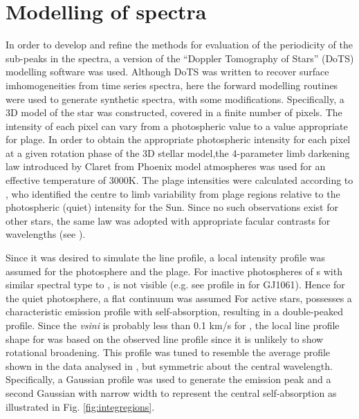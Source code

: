 \chapter{Modelling of {\prox} spectra}
\protect\label{chapter:modelling}

In order to develop and refine the methods for evaluation of the periodicity of the sub-peaks in the {\prox} spectra, a
version of the ``Doppler Tomography of Stars'' (DoTS) modelling software \citep{CCamerondotsa} was used. Although DoTS
was written to recover surface imhomogeneities from time series spectra, here the forward modelling routines were used
to generate synthetic spectra, with some modifications. Specifically, a 3D model of the star was constructed, covered in
a finite number of pixels. The intensity of each pixel can vary from a photospheric value to a value appropriate for
plage. In order to obtain the appropriate photospheric intensity for each pixel at a given rotation phase of the 3D
stellar model,the 4-parameter limb darkening law introduced by Claret from Phoenix model atmospheres \citep{claret00a}
was used for an effective temperature of 3000K. The plage intensities were calculated according to \citet[Section
4.1]{unruh99}, who identified the centre to limb variability from plage regions relative to the photospheric (quiet)
intensity for the Sun. Since no such observations exist for other stars, the same law was adopted with appropriate
facular contrasts for {\ha} wavelengths (see \citet[figs 3 \& 4]{unruh99}).

Since it was desired to simulate the {\ha} line profile, a local intensity profile was assumed for the photosphere and
the plage. For inactive photospheres of \rdwarf s with similar spectral type to {\prox}, {\ha} is not visible (e.g. see
{\ha} profile in \citet[fig. 6]{barnes14} for GJ1061). Hence for the quiet photosphere, a flat continuum was assumed For
active stars, {\ha} possesses a characteristic emission profile with self-absorption, resulting in a double-peaked
profile. Since the \textit{vsini} is probably less than 0.1 km/s for \prox, the local line profile shape for {\ha} was
based on the observed {\prox} line profile since it is unlikely to show rotational broadening. This profile was tuned to
resemble the average {\ha} profile shown in the {\uves} data analysed in \citet{fuhrmeister11}, but symmetric about the
central wavelength. Specifically, a Gaussian profile was used to generate the emission peak and a second Gaussian with
narrow width to represent the central self-absorption as illustrated in Fig. \ref{fig:integregions}.

